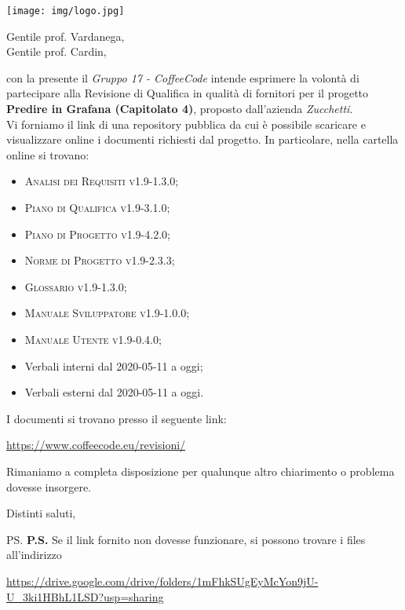 \documentclass{letter}
\date{11 Giugno 2020}
\begin{document}
\begin{letter}{ }

\texttt{[image: img/logo.jpg]}

\opening{Gentile prof. Vardanega, \\
Gentile prof. Cardin,}

con la presente il \textit{Gruppo 17 - CoffeeCode} intende esprimere la volontà di partecipare alla Revisione di Qualifica in qualità di fornitori per il progetto 
\textbf{Predire in Grafana (Capitolato 4)}, proposto dall'azienda \textit{Zucchetti}. \\
Vi forniamo il link di una repository pubblica da cui è possibile scaricare e visualizzare online i documenti richiesti dal progetto. In particolare, nella cartella online si trovano:
\begin{itemize}
  \item \textsc{Analisi dei Requisiti v1.9-1.3.0};
  \item \textsc{Piano di Qualifica v1.9-3.1.0};
  \item \textsc{Piano di Progetto v1.9-4.2.0};
  \item \textsc{Norme di Progetto v1.9-2.3.3};
  \item \textsc{Glossario v1.9-1.3.0};
  \item \textsc{Manuale Sviluppatore v1.9-1.0.0};
  \item \textsc{Manuale Utente v1.9-0.4.0};
  \item Verbali interni dal 2020-05-11 a oggi;
  \item Verbali esterni dal 2020-05-11 a oggi.
\end{itemize}
\newpage
I documenti si trovano presso il seguente link:
\begin{center}
  \centering
  \href{https://www.coffeecode.eu/revisioni/}{https://www.coffeecode.eu/revisioni/}
\end{center}


Rimaniamo a completa disposizione per qualunque altro chiarimento o problema dovesse insorgere.

\closing{Distinti saluti,}

\ps
\textbf{P.S.} Se il link fornito non dovesse funzionare, si possono trovare i files all'indirizzo
\begin{center}
	
	\href{https://drive.google.com/drive/folders/1mFhkSUgEyMcYon9jU-U_3ki1HBhL1LSD?usp=sharing}{https://drive.google.com/drive/folders/1mFhkSUgEyMcYon9jU-U\_3ki1HBhL1LSD?usp=sharing}
\end{center}

\end{letter}
\end{document}
